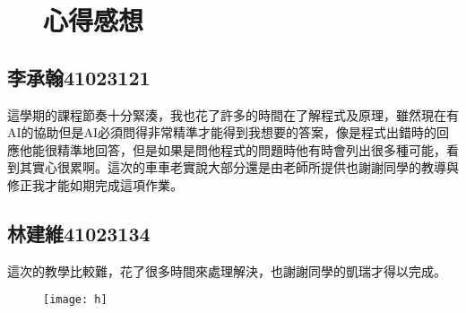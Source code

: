 \begin{figure}[hbt!]
\chapter{心得感想}
\end{figure}
\section{李承翰41023121}
 這學期的課程節奏十分緊湊，我也花了許多的時間在了解程式及原理，雖然現在有AI的協助但是AI必須問得非常精準才能得到我想要的答案，像是程式出錯時的回應他能很精準地回答，但是如果是問他程式的問題時他有時會列出很多種可能，看到其實心很累啊。這次的車車老實說大部分還是由老師所提供也謝謝同學的教導與修正我才能如期完成這項作業。\\[6pt]

\section{林建維41023134}
 這次的教學比較難，花了很多時間來處理解決，也謝謝同學的凱瑞才得以完成。\\
\begin{figure}[hbt!]
\begin{center}
\texttt{[image: h]}
\end{center}
\end{figure} 


